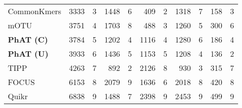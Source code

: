 {\begin{landscape}
\begin{table}[htbp]
{\begin{center}
\begin{tabular}{lrrrrrrrrrr}
        CommonKmers         &   3333    &   3   &   1448    &   6   &  409      &   2   &  1318     &   7   & 158   &   3   \\
        mOTU                &   3751    &   4   &   1703    &   8   &  488      &   3   &  1260     &   5   & 300   &   6   \\
        \textbf{PhAT (C)}   &   3784    &   5   &   1202    &   4   &  1116     &   4   &  1280     &   6   & 186   &   4   \\
        \textbf{PhAT (U)}   &   3933    &   6   &   1436    &   5   &  1153     &   5   &  1208     &   4   & 136   &   2   \\
        TIPP                &   4263    &   7   &   892     &   2   &  2126     &   8   &  930      &   3   & 315   &   7   \\
        FOCUS               &   6153    &   8   &   2079    &   9   &  1636     &   6   &  2018     &   8   & 420   &   8   \\
        Quikr               &   6838    &   9   &   1488    &   7   &  2398     &   9   &  2453     &   9   & 499   &   9   \\
        \bottomrule
    \end{tabular}
    \end{center}
}
\end{table}
\end{landscape}
} %

